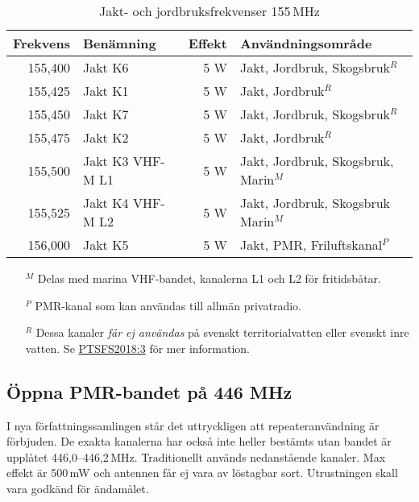 \begin{table}[H]
\centering
\begin{tabular}{rlrl}
	\textbf{Frekvens} & \textbf{Benämning} & \textbf{Effekt} & \textbf{Användningsområde}           \\ \hline
	          155,400 & Jakt K6            &             5 W & Jakt, Jordbruk, Skogsbruk$^R$        \\
	          155,425 & Jakt K1            &             5 W & Jakt, Jordbruk$^R$                   \\
	          155,450 & Jakt K7            &             5 W & Jakt, Jordbruk, Skogsbruk$^R$        \\
	          155,475 & Jakt K2            &             5 W & Jakt, Jordbruk$^R$                   \\
	          155,500 & Jakt K3 VHF-M L1   &             5 W & Jakt, Jordbruk, Skogsbruk, Marin$^M$ \\
	          155,525 & Jakt K4 VHF-M L2   &             5 W & Jakt, Jordbruk, Skogsbruk Marin$^M$  \\
	          156,000 & Jakt K5            &             5 W & Jakt, PMR, Friluftskanal$^P$
\end{tabular}
\caption{Jakt- och jordbruksfrekvenser 155\,MHz}
\end{table}

\footnotesize
\begin{itemize}
	\item[$^M$] Delas med marina VHF-bandet, kanalerna L1 och L2 för fritidsbåtar.
	\item[$^P$] PMR-kanal som kan användas till allmän privatradio.
	\item[$^R$] Dessa kanaler \textit{får ej användas} på svenskt
          territorialvatten eller svenskt inre vatten. Se
          \href{https://pts.se/globalassets/startpage/dokument/legala-dokument/foreskrifter/radio/beslutade_ptsfs-2018-3-undantagsforeskrifter.pdf}{PTSFS2018:3}
          för mer information.
\end{itemize}
\normalsize

\subsection{Öppna PMR-bandet på 446 MHz}

I nya författningssamlingen står det uttryckligen att
repeateranvändning är förbjuden. De exakta kanalerna har också inte
heller bestämts utan bandet är upplåtet
446,0--446,2\,MHz. Traditionellt används nedanstående kanaler. Max
effekt är 500\,mW och antennen får ej vara av löstagbar
sort. Utrustningen skall vara godkänd för ändamålet.

